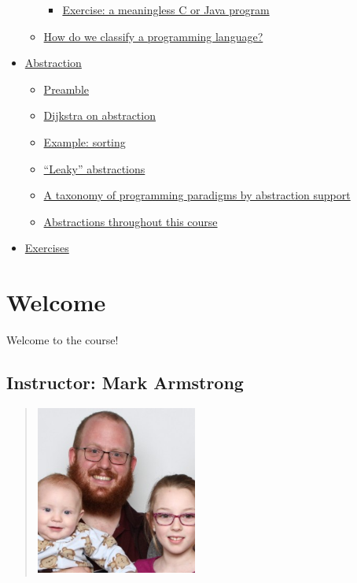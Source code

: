 \documentclass[11pt]{article}
\theoremstyle{definition}
\begin{document}
\begin{scriptsize}
\begin{itemize}
\begin{itemize}
\begin{itemize}
\item \hyperref[sec:org0adb9e7]{Exercise: a meaningless C or Java program}
\end{itemize}
\item \hyperref[sec:orge8c69ff]{How do we classify a programming language?}
\end{itemize}
\item \hyperref[sec:orgdec9f17]{Abstraction}
\begin{itemize}
\item \hyperref[sec:org1e3910e]{Preamble}
\item \hyperref[sec:org5700042]{Dijkstra on abstraction}
\item \hyperref[sec:orgdbf00c9]{Example: sorting}
\item \hyperref[sec:org88cacb3]{“Leaky” abstractions}
\item \hyperref[sec:org2fd130b]{A taxonomy of programming paradigms by abstraction support}
\item \hyperref[sec:org5445a47]{Abstractions throughout this course}
\end{itemize}
\item \hyperref[sec:org6e1a57f]{Exercises}
\end{itemize}
\end{scriptsize}

\section{Welcome}
\label{sec:org42b4ceb}
\begin{center}
Welcome to the course!
\end{center}

\subsection{Instructor: Mark Armstrong}
\label{sec:orgfd0aeed}
\begin{quote}
\includegraphics[width=200px]{./media/markarmstrong.jpg}
\end{quote}
\end{document}
